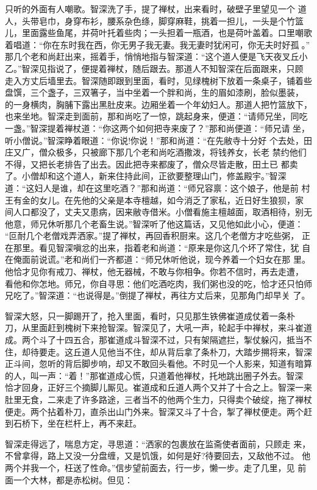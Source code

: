只听的外面有人嘲歌。智深洗了手，提了禅杖，出来看时，破壁子里望见一个
道人，头带皂巾，身穿布衫，腰系杂色绦，脚穿麻鞋，挑着一担儿，一头是个竹篮
儿，里面露些鱼尾，并荷叶托着些肉；一头担着一瓶酒，也是荷叶盖着。口里嘲歌
着唱道：“你在东时我在西，你无男子我无妻。我无妻时犹闲可，你无夫时好孤。”
那几个老和尚赶出来，摇着手，悄悄地指与智深道：“这个道人便是飞天夜叉丘小
乙。”智深见指说了，便提着禅杖，随后跟去。那道人不知智深在后面跟来，只顾
走入方丈后墙里去。智深随即跟到里面，看时，见绿槐树下放着一条桌子，铺着些
盘馔，三个盏子，三双箸子，当中坐着一个胖和尚，生的眉如漆刷，脸似墨装，
的一身横肉，胸脯下露出黑肚皮来。边厢坐着一个年幼妇人。那道人把竹篮放下，
也来坐地。智深走到面前，那和尚吃了一惊，跳起身来，便道：“请师兄坐，同吃
一盏。”智深提着禅杖道：“你这两个如何把寺来废了？”那和尚便道：“师兄请
坐，听小僧说。”智深睁着眼道：“你说!你说！”那和尚道：“在先敝寺十分好
个去处，田庄又广，僧众极多，只被廊下那几个老和尚吃酒撒泼，将钱养女，长老
禁约他们不得，又把长老排告了出去。因此把寺来都废了，僧众尽皆走散，田土已
都卖了。小僧却和这个道人，新来住持此间，正欲要整理山门，修盖殿宇。”智深
道：“这妇人是谁，却在这里吃酒？”那和尚道：“师兄容禀：这个娘子，他是前
村王有金的女儿。在先他的父亲是本寺檀越，如今消乏了家私，近日好生狼狈，家
间人口都没了，丈夫又患病，因来敝寺借米。小僧看施主檀越面，取酒相待，别无
他意，师兄休听那几个老畜生说。”智深听了他这篇话，又见他如此小心，便道：
“叵耐几个老僧戏弄洒家。”提了禅杖，再回香积厨来。这几个老僧方才吃些粥，
正在那里。看见智深嗔忿的出来，指着老和尚道：“原来是你这几个坏了常住，犹
自在俺面前说谎。”老和尚们一齐都道：“师兄休听他说，现今养着一个妇女在那
里。他恰才见你有戒刀、禅杖，他无器械，不敢与你相争。你若不信时，再去走遭，
看他和你怎地。师兄，你自寻思：他们吃酒吃肉，我们粥也没的吃，恰才还只怕师
兄吃了。”智深道：“也说得是。”倒提了禅杖，再往方丈后来，见那角门却早关
了。

智深大怒，只一脚踢开了，抢入里面，看时，只见那生铁佛崔道成仗着一条朴
刀，从里面赶到槐树下来抢智深。智深见了，大吼一声，轮起手中禅杖，来斗崔道
成。两个斗了十四五合，那崔道成斗智深不过，只有架隔遮拦，掣仗躲闪，抵当不
住，却待要走。这丘道人见他当不住，却从背后拿了条朴刀，大踏步搠将来，智深
正斗间，忽听的背后脚步响，却又不敢回头看他。不时见一个人影来，知道有暗算
的人，叫一声：“着！”那崔道成心慌，只道着他禅杖，托地跳出圈子外去。智深
恰才回身，正好三个摘脚儿厮见。崔道成和丘道人两个又并了十合之上。智深一来
肚里无食，二来走了许多路途，三者当不的他两个生力，只得卖个破绽，拖了禅杖
便走。两个拈着朴刀，直杀出山门外来。智深又斗了十合，掣了禅杖便走。两个赶
到石桥下，坐在栏杆上，再不来赶。

智深走得远了，喘息方定，寻思道：“洒家的包裹放在监斋使者面前，只顾走
来，不曾拿得，路上又没一分盘缠，又是饥饿，如何是好?待要回去，又敌他不过。
他两个并我一个，枉送了性命。”信步望前面去，行一步，懒一步。走了几里，见
前面一个大林，都是赤松树。但见：

